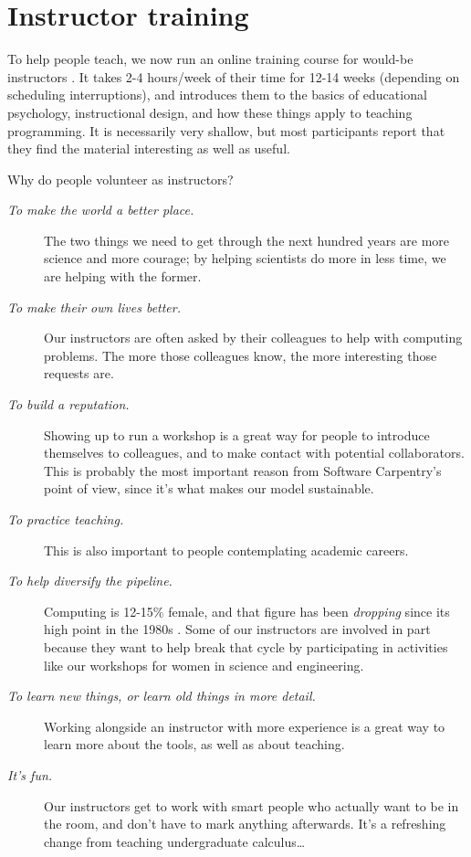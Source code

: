 \documentclass[10pt,a4paper,twocolumn]{article}
\begin{document}
\section*{Instructor training}

To help people teach, we now run an online training course for
would-be instructors \cite{swctraining}. It takes 2-4 hours/week of
their time for 12-14 weeks (depending on scheduling interruptions),
and introduces them to the basics of educational psychology,
instructional design, and how these things apply to teaching
programming. It is necessarily very shallow, but most participants
report that they find the material interesting as well as useful.

Why do people volunteer as instructors?

\begin{description}

\item[\emph{To make the world a better place.}]  The two things we
  need to get through the next hundred years are more science and more
  courage; by helping scientists do more in less time, we are helping
  with the former.

\item[\emph{To make their own lives better.}]  Our instructors are
  often asked by their colleagues to help with computing problems.
  The more those colleagues know, the more interesting those requests
  are.

\item[\emph{To build a reputation.}]  Showing up to run a workshop is
  a great way for people to introduce themselves to colleagues, and to
  make contact with potential collaborators. This is probably the most
  important reason from Software Carpentry's point of view, since it's
  what makes our model sustainable.

\item[\emph{To practice teaching.}]
  This is also important to people contemplating academic careers.
 
\item[\emph{To help diversify the pipeline.}]  Computing is 12-15\%
  female, and that figure has been \emph{dropping} since its high
  point in the 1980s \cite{wic}. Some of our instructors are
  involved in part because they want to help break that cycle by
  participating in activities like our workshops for women in science
  and engineering.

\item[\emph{To learn new things, or learn old things in more detail.}]
  Working alongside an instructor with more experience is a great way
  to learn more about the tools, as well as about teaching.

\item[\emph{It's fun.}]  Our instructors get to work with smart people
  who actually want to be in the room, and don't have to mark anything
  afterwards. It's a refreshing change from teaching undergraduate
  calculus\ldots{}

\end{description}
\end{document}

